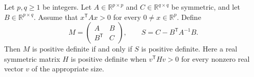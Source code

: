 Let $p,q\geq1$ be integers. Let $A\in\mathbb R^{p\times p}$ and
$C\in\mathbb R^{q\times q}$ be symmetric, and let $B\in\mathbb R^{p\times q}$.
Assume that $x^{\mathsf T}Ax>0$ for every $0\ne x\in\mathbb R^p$. Define
\[
 M=\begin{pmatrix}A&B\\ B^{\mathsf T}&C\end{pmatrix},
 \qquad S=C-B^{\mathsf T}A^{-1}B.
\]
Then $M$ is positive definite if and only if $S$ is positive definite.
Here a real symmetric matrix $H$ is positive definite when
$v^{\mathsf T}Hv>0$ for every nonzero real vector $v$ of the appropriate size.